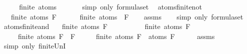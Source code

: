 \begin{isabellebody}
\ \ \isamarkupfalse%
\ \isamarkupfalse%
\ {\isachardoublequoteopen}finite\ {\isacharparenleft}atoms\ {\isasymbottom}{\isacharparenright}{\isachardoublequoteclose}\isanewline
\ \ \ \ \isamarkupfalse%
\ {\isacharparenleft}simp\ only{\isacharcolon}\ formula{\isachardot}set{\isacharparenleft}{}{\isacharparenright}{\isacharparenright}\ \isanewline
{}\isamarkupfalse%
%
\endisatagproof
{\isafoldproof}%
%
\isadelimproof
\isanewline
%
\endisadelimproof
\isanewline
{}\isamarkupfalse%
\ atoms{\isacharunderscore}finite{\isacharunderscore}not{\isacharcolon}\isanewline
\ \ \ {\isachardoublequoteopen}finite\ {\isacharparenleft}atoms\ F{\isacharparenright}{\isachardoublequoteclose}\ \isanewline
\ \ \ \ \ {\isachardoublequoteopen}finite\ {\isacharparenleft}atoms\ {\isacharparenleft}\isactrlbold {\isasymnot}\ F{\isacharparenright}{\isacharparenright}{\isachardoublequoteclose}\isanewline
%
\isadelimproof
\ \ %
\endisadelimproof
%
\isatagproof
{}\isamarkupfalse%
\ assms\isanewline
\ \ \isamarkupfalse%
\ {\isacharparenleft}simp\ only{\isacharcolon}\ formula{\isachardot}set{\isacharparenleft}{}{\isacharparenright}{\isacharparenright}%
\endisatagproof
{\isafoldproof}%
%
\isadelimproof
\ \isanewline
%
\endisadelimproof
\isanewline
{}\isamarkupfalse%
\ atoms{\isacharunderscore}finite{\isacharunderscore}and{\isacharcolon}\isanewline
\ \ \ {\isachardoublequoteopen}finite\ {\isacharparenleft}atoms\ F{}{\isacharparenright}{\isachardoublequoteclose}\isanewline
\ \ \ \ \ \ \ \ \ \ {\isachardoublequoteopen}finite\ {\isacharparenleft}atoms\ F{}{\isacharparenright}{\isachardoublequoteclose}\isanewline
\ \ \ \ \ {\isachardoublequoteopen}finite\ {\isacharparenleft}atoms\ {\isacharparenleft}F{}\ \isactrlbold {\isasymand}\ F{}{\isacharparenright}{\isacharparenright}{\isachardoublequoteclose}\isanewline
%
\isadelimproof
%
\endisadelimproof
%
\isatagproof
{}\isamarkupfalse%
\ {\isacharminus}\isanewline
\ \ \isamarkupfalse%
\ {\isachardoublequoteopen}finite\ {\isacharparenleft}atoms\ F{}\ {\isasymunion}\ atoms\ F{}{\isacharparenright}{\isachardoublequoteclose}\isanewline
\ \ \ \ \isamarkupfalse%
\ assms\isanewline
\ \ \ \ \isamarkupfalse%
\ {\isacharparenleft}simp\ only{\isacharcolon}\ finite{\isacharunderscore}UnI{\isacharparenright}\isanewline

\end{isabellebody}
